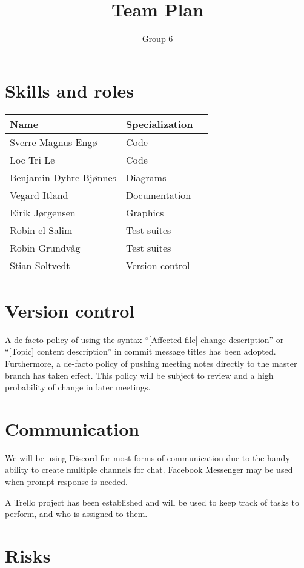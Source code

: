 \documentclass{article}
\title{Team Plan}
\author{Group 6}
\begin{document}
\maketitle

\section*{Skills and roles}

\begin{tabular}{l l l}
    Name                   & Specialization \\
    \midrule
    Sverre Magnus Engø     & Code \\
    Loc Tri Le             & Code \\
    Benjamin Dyhre Bjønnes & Diagrams \\
    Vegard Itland          & Documentation \\
    Eirik Jørgensen        & Graphics \\
    Robin el Salim         & Test suites \\
    Robin Grundvåg         & Test suites \\
    Stian Soltvedt         & Version control \\
\end{tabular}

\section*{Version control}

A de-facto policy of using the syntax ``[Affected file] change description'' or ``[Topic] content description'' in commit message titles has been adopted. Furthermore, a de-facto policy of pushing meeting notes directly to the master branch has taken effect. This policy will be subject to review and a high probability of change in later meetings.

\section*{Communication}

We will be using Discord for most forms of communication due to the handy ability to create multiple channels for chat. Facebook Messenger may be used when prompt response is needed.

A Trello project has been established and will be used to keep track of tasks to perform, and who is assigned to them.

\section*{Risks}
\end{document}
